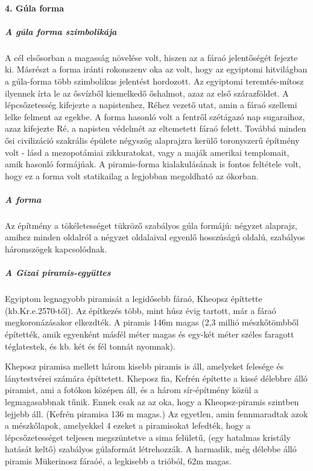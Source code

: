 \paragraph{4. Gúla forma}
\subparagraph{A gúla forma szimbolikája}
A cél elsősorban a magasság növelése volt, hiszen az a fáraó jelentőségét fejezte ki. Másrészt a forma iránti rokonszenv oka az volt, hogy az egyiptomi hitvilágban a gúla-forma több szimbolikus jelentést hordozott. Az egyiptomi teremtés-mítosz ilyennek írta le az ősvízből kiemelkedő őshalmot, azaz az első szárazföldet. A lépcsőzetesség kifejezte a napistenhez, Réhez vezető utat, amin a fáraó szellemi lelke felment az egekbe. A forma hasonló volt a fentről szétágazó nap sugaraihoz, azaz kifejezte Ré, a napisten védelmét az eltemetett fáraó felett. Továbbá minden ősi civilizáció szakrális épülete négyszög alaprajzra kerülő toronyszerű építmény volt - lásd a mezopotámiai zikkuratokat, vagy a maják amerikai templomait, amik hasonló formájúak. A piramis-forma kialakulásának is fontos feltétele volt, hogy ez a forma volt statikailag a legjobban megoldható az ókorban.

\subparagraph{A forma} Az építmény a tökéletességet tükröző szabályos gúla formájú: négyzet alaprajz, amihez minden oldalról a négyzet oldalaival egyenlő hosszúságú oldalú, szabályos háromszögek kapcsolódnak.

\subparagraph{A Gízai piramis-együttes}
Egyiptom legnagyobb piramisát a legidősebb fáraó, Kheopsz építtette (kb.Kr.e.2570-től). Az építkezés több, mint húsz évig tartott, már a fáraó megkoronázásakor elkezdték. A piramis 146m magas (2,3 millió mészkőtömbből építették, amik egyenként másfél méter magas és egy-két méter széles faragott téglatestek, és kb. két és fél tonnát nyomnak).

\begin{figure}
\end{figure}

Kheposz piramisa mellett három kisebb piramis is áll, amelyeket felesége és lánytestvérei számára építtetett.
Kheposz fia, Kefrén építette a kissé délebbre álló piramist, ami a fotókon középen áll, és
a három sír-építmény közül a legmagasabbnak tűnik. Ennek csak az az oka, hogy a Kheopsz-piramis szintben lejjebb áll. (Kefrén piramisa 136 m magas.) Az egyetlen, amin fennmaradtak azok a mészkőlapok, amelyekkel
4
ezeket a piramisokat lefedték, hogy a lépcsőzetességet teljesen megszüntetve a sima felületű, (egy hatalmas kristály hatását keltő) szabályos gúlaformát létrehozzák.
A harmadik, még délebbe álló piramis Mükerinosz fáraóé, a legkisebb a trióból, 62m magas.

